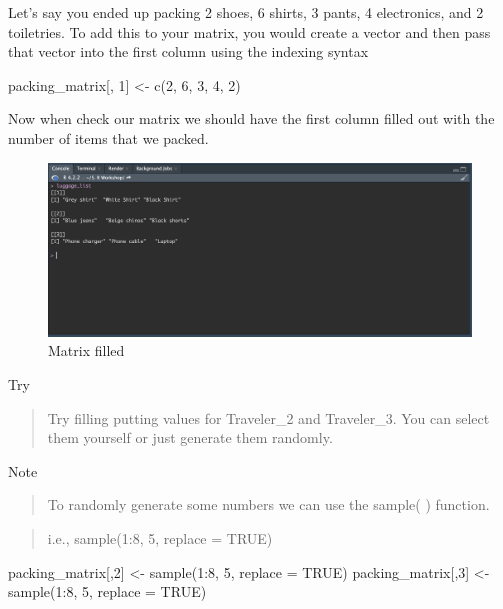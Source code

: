 \documentclass[
]{book}
\newenvironment{Shaded}{\begin{snugshade}}{\end{snugshade}}
\newcommand{\AttributeTok}[1]{\textcolor[rgb]{0.77,0.63,0.00}{#1}}
\newcommand{\ConstantTok}[1]{\textcolor[rgb]{0.00,0.00,0.00}{#1}}
\newcommand{\DecValTok}[1]{\textcolor[rgb]{0.00,0.00,0.81}{#1}}
\newcommand{\FunctionTok}[1]{\textcolor[rgb]{0.00,0.00,0.00}{#1}}
\newcommand{\NormalTok}[1]{#1}
\newcommand{\OtherTok}[1]{\textcolor[rgb]{0.56,0.35,0.01}{#1}}
\newcommand{\SpecialCharTok}[1]{\textcolor[rgb]{0.00,0.00,0.00}{#1}}
\begin{document}
Let's say you ended up packing 2 shoes, 6 shirts, 3 pants, 4 electronics, and 2 toiletries. To add this to your matrix, you would create a vector and then pass that vector into the first column using the indexing syntax

\begin{Shaded}
\begin{Highlighting}[]
\NormalTok{packing\_matrix[, }\DecValTok{1}\NormalTok{] }\OtherTok{\textless{}{-}} \FunctionTok{c}\NormalTok{(}\DecValTok{2}\NormalTok{, }\DecValTok{6}\NormalTok{, }\DecValTok{3}\NormalTok{, }\DecValTok{4}\NormalTok{, }\DecValTok{2}\NormalTok{)}
\end{Highlighting}
\end{Shaded}

Now when check our matrix we should have the first column filled out with the number of items that we packed.

\begin{figure}
\includegraphics[width=29.36in]{images/3.6listconsole} \caption{Matrix filled}\label{fig:unnamed-chunk-21}
\end{figure}

Try

\begin{quote}
Try filling putting values for Traveler\_2 and Traveler\_3. You can select them yourself or just generate them randomly.
\end{quote}

Note

\begin{quote}
To randomly generate some numbers we can use the sample( ) function.
\end{quote}

\begin{quote}
i.e., sample(1:8, 5, replace = TRUE)
\end{quote}

\begin{Shaded}
\begin{Highlighting}[]
\NormalTok{packing\_matrix[,}\DecValTok{2}\NormalTok{] }\OtherTok{\textless{}{-}} \FunctionTok{sample}\NormalTok{(}\DecValTok{1}\SpecialCharTok{:}\DecValTok{8}\NormalTok{, }\DecValTok{5}\NormalTok{, }\AttributeTok{replace =} \ConstantTok{TRUE}\NormalTok{)}
\NormalTok{packing\_matrix[,}\DecValTok{3}\NormalTok{] }\OtherTok{\textless{}{-}} \FunctionTok{sample}\NormalTok{(}\DecValTok{1}\SpecialCharTok{:}\DecValTok{8}\NormalTok{, }\DecValTok{5}\NormalTok{, }\AttributeTok{replace =} \ConstantTok{TRUE}\NormalTok{)}
\end{Highlighting}
\end{Shaded}
\end{document}
